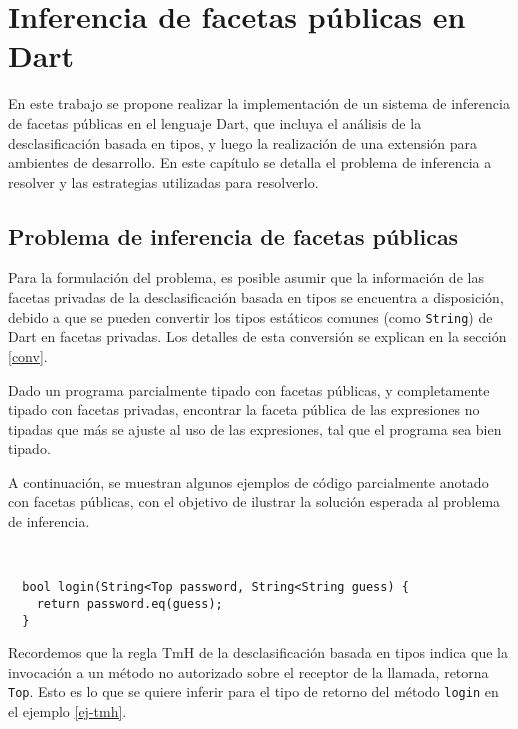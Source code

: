\chapter{Inferencia de facetas públicas en Dart}

En este trabajo se propone realizar la implementación de un sistema de inferencia de facetas públicas en el lenguaje Dart, que incluya el análisis de la desclasificación basada en tipos, y luego la realización de una extensión para ambientes de desarrollo. En este capítulo se detalla el problema de inferencia a resolver y las estrategias utilizadas para resolverlo.

\section{Problema de inferencia de facetas públicas}
Para la formulación del problema, es posible asumir que la información de las facetas privadas de la desclasificación basada en tipos se encuentra a disposición, debido a que se pueden convertir los tipos estáticos comunes (como \texttt{String}) de Dart en facetas privadas. Los detalles de esta conversión se explican en la sección \ref{conv}.

\begin{defn}
  Dado un programa parcialmente tipado con facetas públicas, y completamente tipado con facetas privadas, encontrar la faceta pública de las expresiones no tipadas que más se ajuste al uso de las expresiones, tal que el programa sea bien tipado.
\end{defn}

A continuación, se muestran algunos ejemplos de código parcialmente anotado con facetas públicas, con el objetivo de ilustrar la solución esperada al problema de inferencia.

\begin{ej} \ \\
  \label{ej-tmh}
  \normalfont
\begin{lstlisting}
  bool login(String<Top password, String<String guess) {
    return password.eq(guess);
  }
\end{lstlisting}
\end{ej}

Recordemos que la regla $\text{TmH}$ de la desclasificación basada en tipos indica que la invocación a un método no autorizado sobre el receptor de la llamada, retorna \texttt{Top}. Esto es lo que se quiere inferir para el tipo de retorno del método \texttt{login} en el ejemplo \ref{ej-tmh}.

